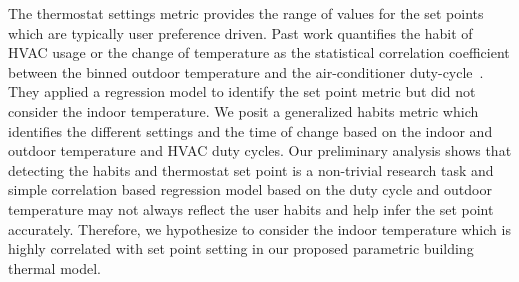 \documentclass{sig-alternate}
\begin{document}
The thermostat settings metric provides the range of values for the set points which are typically user preference driven. Past work quantifies the habit of HVAC usage or the change of temperature as the statistical correlation coefficient between the binned outdoor temperature and the air-conditioner duty-cycle~\cite{Thermostat}.  
They applied a regression model to identify the set point metric but did not consider the indoor temperature. We posit a generalized habits metric which identifies the different settings and the time of change based on the indoor and outdoor temperature and HVAC duty cycles. Our preliminary analysis shows that detecting the habits and thermostat set point is a non-trivial research task and simple correlation based regression model based on the duty cycle and outdoor temperature may not always reflect the user habits and help infer the set point accurately. Therefore, we hypothesize to consider the indoor temperature which is highly correlated with set point setting in our proposed parametric building thermal model.
\end{document}
